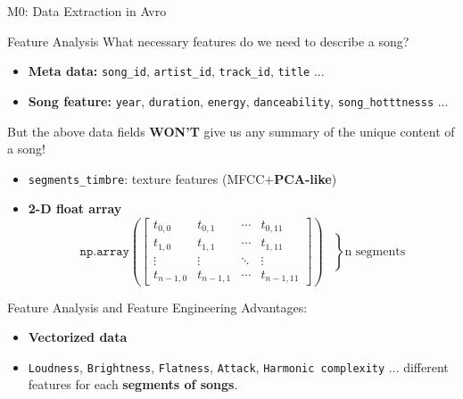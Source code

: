 \documentclass{beamer}
\begin{document}
\begin{section}{M0: Data Extraction in Avro}
    \begin{frame}{Feature Analysis}
        What necessary features do we need to describe a song?
        \begin{itemize}
            \item \textbf{Meta data:} \texttt{song\_id}, \texttt{artist\_id}, \texttt{track\_id}, \texttt{title} ...
            \item \textbf{Song feature:} \texttt{year}, \texttt{duration}, \texttt{energy}, \texttt{danceability}, \texttt{song\_hotttnesss} ...
        \end{itemize}
        But the above data fields \textbf{WON'T} give us any summary of the unique content of a song!
        \begin{itemize}
            \item \texttt{segments\_timbre}: texture features (MFCC+\textbf{PCA-like})	
            \item \textbf{2-D float array}
                \[
                \texttt{np.array}\left(
                \left[
                \begin{array}{cccc}
                t_{0,0} & t_{0,1} & \cdots & t_{0,11} \\
                t_{1,0} & t_{1,1} & \cdots & t_{1,11} \\
                \vdots  & \vdots  & \ddots & \vdots  \\
                t_{n-1,0} & t_{n-1,1} & \cdots & t_{n-1,11}
                \end{array}
                \right]
                \right)
                \left.\begin{array}{c}
                \\ \\ \\ \\[-1ex] \\
                \end{array}\right\} \text{n segments}
                \]
        \end{itemize}
    \end{frame}
    \begin{frame}{Feature Analysis and Feature Engineering}
    Advantages:
        \begin{itemize}
            \item \textbf{Vectorized data}
            \item \texttt{Loudness}, \texttt{Brightness}, \texttt{Flatness}, \texttt{Attack}, \texttt{Harmonic complexity} ... different features for each \textbf{segments of songs}.

\end{itemize}
\end{frame}
\end{section}
\end{document}
